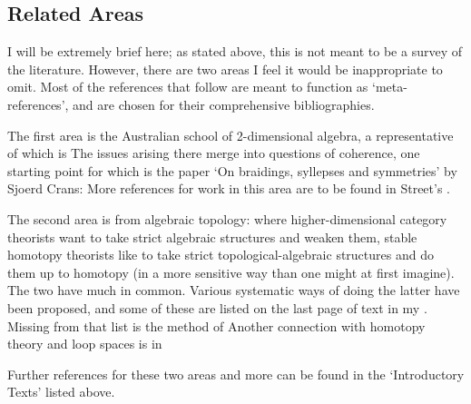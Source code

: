 \subsection*{Related Areas}

I will be extremely brief here; as stated above, this is not meant to be a
survey of the literature.  However, there are two areas I feel it would be
inappropriate to omit.  Most of the references that follow are meant to
function as `meta-references', and are chosen for their comprehensive
bibliographies.

The first area is the Australian school of 2-dimensional algebra, a
representative of which is
% 
%
% 
The issues arising there merge into questions of coherence, one starting point
for which is the paper `On braidings, syllepses and symmetries' by
Sjoerd Crans:
% 
%
% 
% 
%
% 
More references for work in this area are to be found in Street's .

The second area is from algebraic topology: where higher-dimensional category
theorists want to take strict algebraic structures and weaken them, stable
homotopy theorists like to take strict topological-algebraic structures and do
them up to homotopy (in a more sensitive way than one might at first
imagine).  The two have much in common.  Various systematic ways of doing the
latter have been proposed, and some of these are listed on the last page of
text in my .  Missing from that list is the method of
% 
% 
% 
Another connection with homotopy theory and loop spaces is in 
% 
%

Further references for these two areas and more can be found in the
`Introductory Texts' listed above. 











